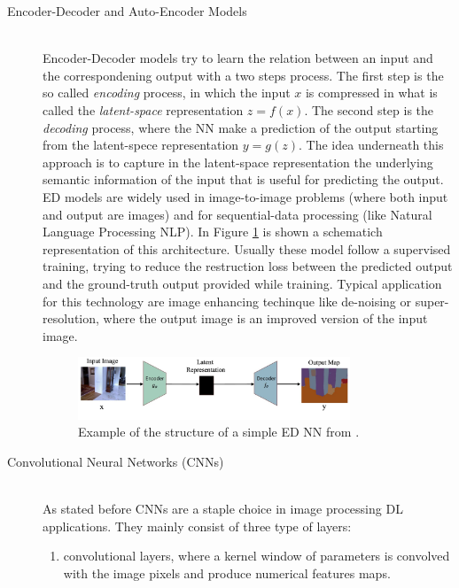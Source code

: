 \begin{description}
    \item [Encoder-Decoder and Auto-Encoder Models] \hfill \\
            Encoder-Decoder models try to learn the relation between an input and the correspondening output with a two steps process. The first step is the so called \textit{encoding} process, in which the input $x$ is compressed in what is called the \textit{latent-space} representation $z = f(x)$. The second step is the \textit{decoding} process, where the NN make a prediction of the output starting from the latent-spece representation $ y = g(z)$. The idea underneath this approach is to capture in the latent-space representation the underlying semantic information of the input that is useful for predicting the output. ED models are widely used in image-to-image problems (where both input and output are images) and for sequential-data processing (like Natural Language Processing NLP). In Figure \ref{fig:EDNN} is shown a schematich representation of this architecture. Usually these model follow a supervised training, trying to reduce the restruction loss between the predicted output and the ground-truth output provided while training. Typical application for this technology are image enhancing techinque like de-noising or super-resolution, where the output image is an improved version of the input image.

        \begin{figure}
            \centering
            \includegraphics[width = 0.8\textwidth]{images/EDnet}
            \caption{Example of the structure of a simple ED NN from  \cite{deep_seg_SOA}.}
            \label{fig:EDNN}
        \end{figure}

    \item [Convolutional Neural Networks (CNNs)] \hfill \\
        As stated before CNNs are a staple choice in image processing DL applications. They mainly consist of three type of layers:

        \begin{enumerate}[i]
            \item convolutional layers, where a kernel window of parameters is convolved with the image pixels and produce numerical features maps.


\end{enumerate}
\end{description}
